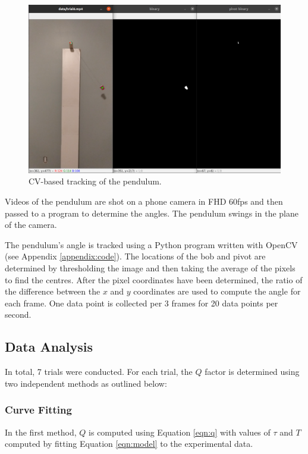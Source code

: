 \documentclass[aps,twocolumn,secnumarabic,nobalancelastpage,amsmath,amssymb,nofootinbib]{revtex4}
\begin{document}
\begin{figure}[htb]
    \includegraphics[width=\linewidth]{cv_track.png}
    \caption{CV-based tracking of the pendulum.}
\end{figure}

Videos of the pendulum are shot on a phone camera in FHD 60fps and then passed to a program to determine the angles.
The pendulum swings in the plane of the camera.

The pendulum's angle is tracked using a Python program written with OpenCV (see Appendix \ref{appendix:code}).
The locations of the bob and pivot are determined by thresholding the image and then taking the average of the pixels to
find the centres. After the pixel coordinates have been determined, the ratio of the difference between the \(x\) and
\(y\) coordinates are used to compute the angle for each frame.
One data point is collected per 3 frames for 20 data points per second.

\subsection{Data Analysis}

In total, 7 trials were conducted.
For each trial, the \(Q\) factor is determined using two independent methods as outlined below:

\subsubsection{Curve Fitting}

In the first method, \(Q\) is computed using Equation \ref{eqn:q} with values of \(\tau\) and \(T\) computed by fitting
Equation \ref{eqn:model} to the experimental data.
\end{document}
